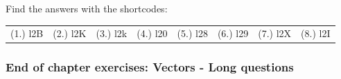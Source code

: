       
      \label{m38819*uid117}
\par {} Find the answers with the shortcodes:
 \par \begin{tabular}[h]{cccccc}
 (1.) l2B  &  (2.) l2K  &  (3.) l2k  &  (4.) l20  &  (5.) l28  &  (6.) l29  &  (7.) l2X  &  (8.) l2I  & \end{tabular}



            \subsubsection{ End of chapter exercises: Vectors - Long questions}
            \nopagebreak
            
